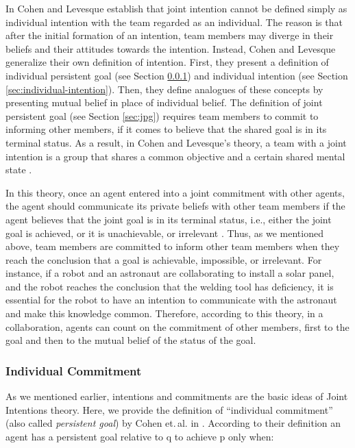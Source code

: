 \documentclass[12pt]{report}
\begin{document}
In \cite{cohen:teamwork} Cohen and Levesque establish that joint intention
cannot be defined simply as individual intention with the team regarded as an
individual. The reason is that after the initial formation of an intention, team
members may diverge in their beliefs and their attitudes towards the intention.
Instead, Cohen and Levesque generalize their own definition of intention. First,
they present a definition of individual persistent goal (see Section
\ref{sec:individual-commitment}) and individual intention (see Section
\ref{sec:individual-intention}). Then, they define analogues of these concepts
by presenting mutual belief in place of individual belief. The definition of
joint persistent goal (see Section \ref{sec:jpg}) requires team members to
commit to informing other members, if it comes to believe that the shared goal
is in its terminal status. As a result, in Cohen and Levesque's theory, a team
with a joint intention is a group that shares a common objective and a certain
shared mental state \cite{jarvis:teams-multiagent-systems}.

In this theory, once an agent entered into a joint commitment with other agents,
the agent should communicate its private beliefs with other team members if the
agent believes that the joint goal is in its terminal status, i.e., either the
joint goal is achieved, or it is unachievable, or irrelevant
\cite{wilsker:study-theories}. Thus, as we mentioned above, team members are
committed to inform other team members when they reach the conclusion that a
goal is achievable, impossible, or irrelevant. For instance, if a robot and an
astronaut are collaborating to install a solar panel, and the robot reaches the
conclusion that the welding tool has deficiency, it is essential for the robot
to have an intention to communicate with the astronaut and make this knowledge
common. Therefore, according to this theory, in a collaboration, agents can
count on the commitment of other members, first to the goal and then to the
mutual belief of the status of the goal.

\subsubsection{Individual Commitment}
\label{sec:individual-commitment}

As we mentioned earlier, intentions and commitments are the basic ideas of Joint
Intentions theory. Here, we provide the definition of ``individual commitment''
(also called \textit{persistent goal}) by Cohen et.\,al. in
\cite{cohen:team-formation}. According to their definition an agent has a
persistent goal relative to q to achieve p only when:
\end{document}
